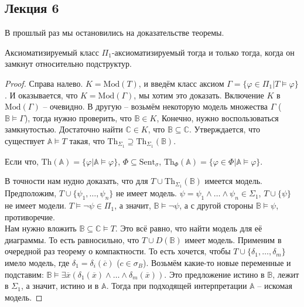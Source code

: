 \subsection{Лекция 6}

В прошлый раз мы остановились на доказательстве теоремы. \\

\begin{theorem}
    Аксиоматизируемый класс $\Pi_1$-аксиоматизируемый тогда и только тогда, когда он замкнут относительно подструктур.
\end{theorem}

\begin{proof}
    Справа налево. $K = \text{Mod}(T)$, и введём класс аксиом $\Gamma = \{\varphi \in \Pi_1 | T \models \varphi\}$. И оказывается, что $K = \text{Mod}(\Gamma)$, мы хотим это доказать. Включение $K$ в $\text{Mod}(\Gamma)$ -- очевидно. В другую -- возьмём некоторую модель множества $\Gamma$ ($\mathbb{B} \models \Gamma$), тогда нужно проверить, что $\mathbb{B} \in K$, Конечно, нужно воспользоваться замкнутостью. Достаточно найти $\mathbb{C} \in K$, что $\mathbb{B} \subseteq \mathbb{C}$. Утверждается, что существует $\mathbb{A} \models T$ такая, что $\text{Th}_{\Sigma_1} \supseteq \text{Th}_{\Sigma_1}(\mathbb{B})$. 

    \begin{definition}
        Если что, $\text{Th}(\mathbb{A}) = \{\varphi | \mathbb{A} \models \varphi\}$, $\Phi \subseteq \text{Sent}_\sigma$, $\text{Th}_{\Phi}(\mathbb{A}) = \{\varphi \in \Phi | \mathbb{A} \models \varphi\}$.
    \end{definition}

    В точности нам нудно доказать, что для $T \cup \text{Th}_{\Sigma_1}(\mathbb{B})$ имеется модель. Предположим, $T \cup \{\psi_1, \ldots, \psi_n\}$ не имеет модель. $\psi = \psi_1 \wedge \ldots \wedge \psi_n \in \Sigma_1$, $T \cup \{\psi\}$ не имеет модели. $T \models \neg \psi \in \Pi_1$, а значит, $\mathbb{B} \models \neg \psi$, а с другой стороны $\mathbb{B} \models \psi$, противоречие. \\ 

    Нам нужно вложить $\mathbb{B} \subseteq \mathbb{C} \models T$. Это всё равно, что найти модель для её диаграммы. То есть равносильно, что $T \cup D(\mathbb{B})$ имеет модель. Применим в очередной раз теорему о компактности. То есть хочется, чтобы $T \cup \{\delta_1, \ldots, \delta_m\}$ имело модель, где $\delta_1 = \delta_i(\overline{c})$ ($c \in \sigma_B$). Возьмём какие-то новые переменные и подставим: $\mathbb{B} \models \exists \overline{x} (\delta_1(\overline{x}) \wedge \ldots \wedge \delta_m(\overline{x}))$. Это предложение истино в $\mathbb{B}$, лежит в $\Sigma_1$, а значит, истино и в $\mathbb{A}$. Тогда при подходящей интерпретации $\mathbb{A}$ -- искомая модель.
\end{proof}

